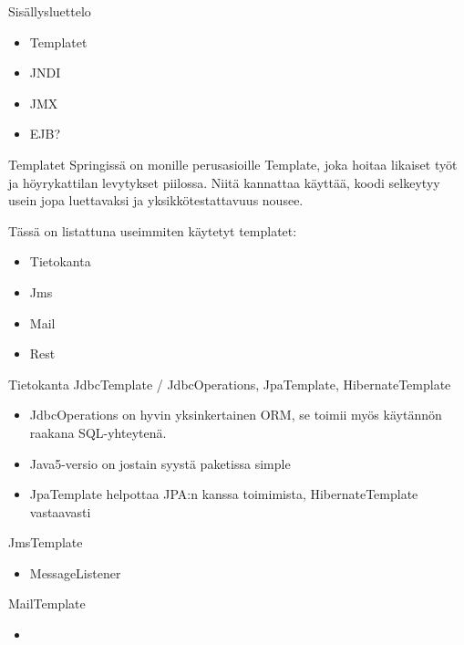 \documentclass[hyperref={pdfauthor=\AUTHOR},14pt]{beamer}
\author{\AUTHOR}
\title[\TITLE]{\TITLE}
\date{\DATE}
\begin{document}
\begin{frame}[plain]
\titlepage
\end{frame}

\begin{frame}{Sisällysluettelo}
\begin{itemize}
\item Templatet
\item JNDI
\item JMX
\item EJB?
\end{itemize}
\end{frame}

\begin{frame}{Templatet}
Springissä on monille perusasioille Template, joka hoitaa likaiset työt ja höyrykattilan levytykset piilossa. Niitä kannattaa käyttää, koodi selkeytyy usein jopa luettavaksi ja yksikkötestattavuus nousee.

Tässä on listattuna useimmiten käytetyt templatet:
\begin{itemize}
\item Tietokanta
\item Jms
\item Mail
\item Rest
\end{itemize}
\end{frame}

\begin{frame}{Tietokanta}
JdbcTemplate / JdbcOperations,  JpaTemplate, HibernateTemplate
\begin{itemize}
\item JdbcOperations on hyvin yksinkertainen ORM, se toimii myös käytännön raakana SQL-yhteytenä.
\item Java5-versio on jostain syystä paketissa simple
\item JpaTemplate helpottaa JPA:n kanssa toimimista, HibernateTemplate vastaavasti
\end{itemize}
\end{frame}

\begin{frame}{JmsTemplate}
\begin{itemize}
\item MessageListener
\end{itemize}
\end{frame}

\begin{frame}{MailTemplate}
\begin{itemize}
\item 
\end{itemize}
\end{frame}
\end{document}
